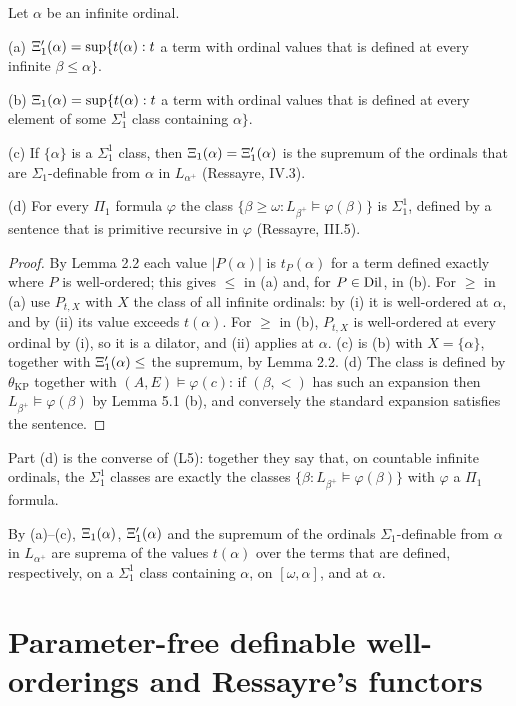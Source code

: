 \documentclass[11pt]{article}
\begin{document}
\begin{statement} Let $\alpha$ be an infinite ordinal.

(a) $\Xi'_1(\alpha) = \sup\{t(\alpha) : t$ a term with ordinal values that is defined at every infinite
$\beta \le \alpha\}$.

(b) $\Xi_1(\alpha) = \sup\{t(\alpha) : t$ a term with ordinal values that is defined at every element of some
$\Sigma^1_1$ class containing $\alpha\}$.

(c) If $\{\alpha\}$ is a $\Sigma^1_1$ class, then $\Xi_1(\alpha) = \Xi'_1(\alpha)$ is the supremum of the ordinals that
are $\Sigma_1$-definable from $\alpha$ in $L_{\alpha^+}$ (Ressayre, IV.3).

(d) For every $\Pi_1$ formula $\varphi$ the class $\{\beta \ge \omega : L_{\beta^+} \models \varphi(\beta)\}$ is
$\Sigma^1_1$, defined by a sentence that is primitive recursive in $\varphi$ (Ressayre, III.5).
\end{statement}

\begin{proof} By Lemma 2.2 each value $|P(\alpha)|$ is $t_P(\alpha)$ for a term defined exactly where $P$ is
well-ordered; this gives $\le$ in (a) and, for $P \in \mathrm{Dil}$, in (b). For $\ge$ in (a) use $P_{t, X}$ with $X$ the
class of all infinite ordinals: by (i) it is well-ordered at $\alpha$, and by (ii) its value exceeds $t(\alpha)$.
For $\ge$ in (b), $P_{t, X}$ is well-ordered at every ordinal by (i), so it is a dilator, and (ii) applies at
$\alpha$. (c) is (b) with $X = \{\alpha\}$, together with $\Xi'_1(\alpha) \le$ the supremum, by Lemma 2.2. (d) The
class is defined by $\theta_{\mathrm{KP}}$ together with $(A, E) \models \varphi(c)$: if $(\beta, <)$ has such an
expansion then $L_{\beta^+} \models \varphi(\beta)$ by Lemma 5.1 (b), and conversely the standard expansion
satisfies the sentence.
\end{proof}

Part (d) is the converse of (L5): together they say that, on countable infinite ordinals, the $\Sigma^1_1$ classes
are exactly the classes $\{\beta : L_{\beta^+} \models \varphi(\beta)\}$ with $\varphi$ a $\Pi_1$ formula.

By (a)--(c), $\Xi_1(\alpha)$, $\Xi'_1(\alpha)$ and the supremum of the ordinals $\Sigma_1$-definable from $\alpha$ in
$L_{\alpha^+}$ are suprema of the values $t(\alpha)$ over the terms that are defined, respectively, on a
$\Sigma^1_1$ class containing $\alpha$, on $[\omega, \alpha]$, and at $\alpha$.

\section{Parameter-free definable well-orderings and Ressayre's functors}
\end{document}
